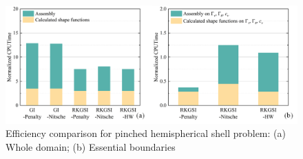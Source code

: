 \begin{figure}[!ht]
\centering
\includegraphics[width=\textwidth]{figures/efficient}
\caption{Efficiency comparison for pinched hemispherical shell problem: (a) Whole domain; (b) Essential boundaries}\label{phf3}
\end{figure}


